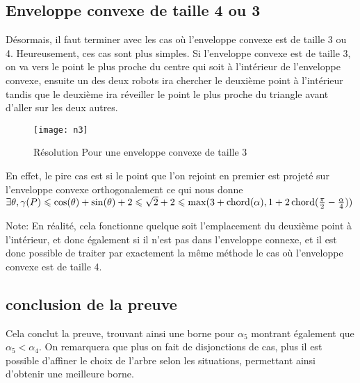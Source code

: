 \subsection{Enveloppe convexe de taille 4 ou 3}\label{conv3}

Désormais, il faut terminer avec les cas où l'enveloppe convexe est de taille 3 ou 4. Heureusement, ces cas sont plus simples.
Si l'enveloppe convexe est de taille 3, on va vers le point le plus proche du centre qui soit à l'intérieur de l'enveloppe convexe, ensuite un des deux robots ira chercher le deuxième point à l'intérieur tandis que le deuxième ira réveiller le point le plus proche du triangle avant d'aller sur les deux autres.

\begin{figure}[h!]
  \centering
  \texttt{[image: n3]}
  \caption{Résolution Pour une enveloppe convexe de taille 3}
  \label{fig:n3}
\end{figure}

En effet, le pire cas est si le point que l'on rejoint en premier est projeté sur l'enveloppe convexe orthogonalement ce qui nous donne $\exists \theta, \gamma(P) \leqslant \cos(\theta) + \sin(\theta) + 2 \leqslant \sqrt{2} + 2 \leqslant \max(3 + \operatorname{chord}(\alpha), 1 + 2\operatorname{chord}(\frac{\pi}{2} - \frac{\alpha}{4}))$

Note: En réalité, cela fonctionne quelque soit l'emplacement du deuxième point à l'intérieur, et donc également si il n'est pas dans l'enveloppe connexe, et il est donc possible de traiter par exactement la même méthode le cas où l'enveloppe convexe est de taille 4.

\subsection{conclusion de la preuve}

Cela conclut la preuve, trouvant ainsi une borne pour $\alpha_5$ montrant également que $\alpha_5 < \alpha_4$. On remarquera que plus on fait de disjonctions de cas, plus il est possible d'affiner le choix de l'arbre selon les situations, permettant ainsi d'obtenir une meilleure borne.
